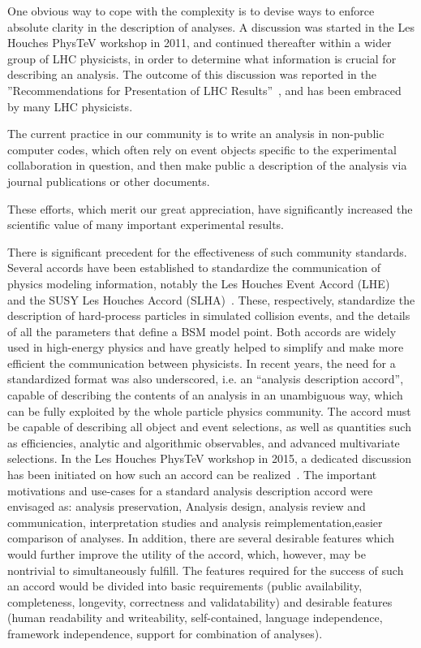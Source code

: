 \documentclass[11pt]{cernrep}
\begin{document}
One obvious way to cope with the complexity is to devise ways to enforce absolute clarity in the description of analyses.
A discussion was started in the Les Houches PhysTeV workshop in 2011, and continued
thereafter within a wider group of LHC physicists, in order to determine what information is
crucial for describing an analysis. The outcome of this discussion was reported in the
''Recommendations for Presentation of LHC Results''~\cite{Brooijmans:2012yi,Kraml:2012sg,Brooijmans:2016vro}, and has been embraced by many LHC physicists.

The current practice in our community is to write an analysis in non-public computer codes,
which often rely on event objects specific to the experimental collaboration in question,
and then make public a description of the analysis via journal publications or other documents.

These efforts, which merit our great appreciation,
have significantly increased the scientific value of many important experimental results.

There is significant precedent for the effectiveness of such community standards. Several
accords have been established to standardize the communication of physics modeling information,
notably the Les Houches Event Accord (LHE)~\cite{Boos:2001cv,Alwall:2006yp} and the SUSY Les Houches Accord (SLHA)~\cite{Allanach:2008qq,Skands:2003cj}.
These, respectively, standardize the description of hard-process
particles in simulated collision events, and the details of all the parameters that define a BSM model point.
Both accords are widely used in high-energy physics and have greatly helped to
simplify and make more efficient the communication between physicists.
In recent years, the need for a standardized format was also underscored, i.e. an “analysis description
accord”, capable of describing the contents of an analysis in an unambiguous way, which can
be fully exploited by the whole particle physics community.  The accord must be capable of
describing all object and event selections, as well as quantities such as efficiencies, analytic and
algorithmic observables, and advanced multivariate selections.
In the Les Houches PhysTeV workshop in 2015, a dedicated discussion has been initiated
on how such an accord can be realized~\cite{Brooijmans:2016vro}.
The important motivations and use-cases for a standard analysis description accord were envisaged as:
analysis preservation, Analysis design, analysis review and communication, interpretation studies and analysis reimplementation,easier comparison of analyses.
In addition, there are several desirable features which would further improve the utility
of the accord, which, however, may be nontrivial to simultaneously fulfill.  
The features required for the success of such an accord would be divided into basic requirements (public availability, completeness, longevity, correctness and validatability) and desirable features (human readability and writeability, self-contained, language independence, framework independence, support for combination of analyses). 
\end{document}

